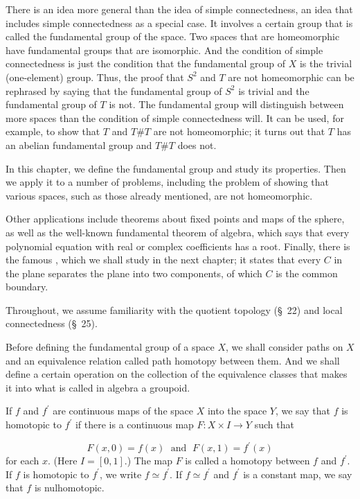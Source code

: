 There is an idea more general than the idea of simple connectedness, an idea that includes simple connectedness as a special case. It involves a certain group that is called the fundamental group of the space. Two spaces that are homeomorphic have fundamental groups that are isomorphic. And the condition of simple connectedness is just the condition that the fundamental group of \(X\) is the trivial (one-element) group. Thus, the proof that \(S^{2}\) and \(T\) are not homeomorphic can be rephrased by saying that the fundamental group of \(S^{2}\) is trivial and the fundamental group of \(T\) is not. The fundamental group will distinguish between more spaces than the condition of simple connectedness will. It can be used, for example, to show that \(T\) and \(T\# T\) are not homeomorphic; it turns out that \(T\) has an abelian fundamental group and \(T\# T\) does not.

In this chapter, we define the fundamental group and study its properties. Then we apply it to a number of problems, including the problem of showing that various spaces, such as those already mentioned, are not homeomorphic.

Other applications include theorems about fixed points and maps of the sphere, as well as the well-known fundamental theorem of algebra, which says that every polynomial equation with real or complex coefficients has a root. Finally, there is the famous , which we shall study in the next chapter; it states that every  \(C\) in the plane separates the plane into two components, of which \(C\) is the common boundary.

Throughout, we assume familiarity with the quotient topology (\S\ 22) and local connectedness (\S\ 25).


Before defining the fundamental group of a space \(X\), we shall consider paths on \(X\) and an equivalence relation called path homotopy between them. And we shall define a certain operation on the collection of the equivalence classes that makes it into what is called in algebra a groupoid.

\begin{definition}
If \(f\) and \(f^{\prime }\) are continuous maps of the space \(X\) into the space \(Y\), we say that \(f\) is homotopic to \(f^{\prime }\) if there is a continuous map \(F : X \times I \rightarrow Y\) such that

\[
F( {x,0}) = f(x) \;\text{ and }\;F( {x,1}) = f^{\prime }(x)
\]
for each \(x\). (Here \(I = [ {0,1}]\).) The map \(F\) is called a homotopy between \(f\) and \(f^{\prime }\). If \(f\) is homotopic to \(f^{\prime }\), we write \(f \simeq {f}^{\prime }\). If \(f \simeq {f}^{\prime }\) and \(f^{\prime }\) is a constant map, we say that \(f\) is nulhomotopic.
\end{definition}


